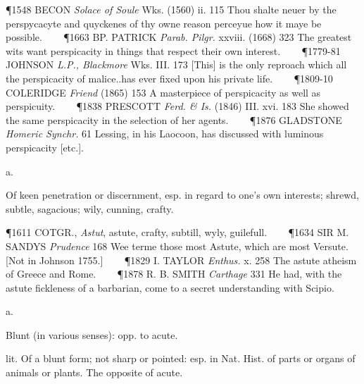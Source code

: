 \begin{description}[wide, labelwidth=!, labelindent=0pt]
\begin{myenumerate}
\P 1548 BECON  \textit{Solace of Soule} Wks. (1560) ii. 115 Thou shalte neuer by the perspycacyte and quyckenes of thy owne reason perceyue how it maye be possible.    
\P 1663 BP. PATRICK  \textit{Parab. Pilgr.} xxviii. (1668) 323 The greatest wits want perspicacity in things that respect their own interest.    
\P 1779-81 JOHNSON  \textit{L.P., Blackmore} Wks. III. 173 [This] is the only reproach which all the perspicacity of malice..has ever fixed upon his private life.    
\P 1809-10 COLERIDGE  \textit{Friend} (1865) 153 A masterpiece of perspicacity as well as perspicuity.    
\P 1838 PRESCOTT  \textit{Ferd. \& Is.} (1846) III. xvi. 183 She showed the same perspicacity in the selection of her agents.    
\P 1876 GLADSTONE  \textit{Homeric Synchr.} 61 Lessing, in his Laocoon, has discussed with luminous perspicacity [etc.].
\end{myenumerate}

 a.

\noindent {}

\vspace{-0.3cm}

Of keen penetration or discernment, esp. in regard to one's own interests; shrewd, subtle, sagacious; wily, cunning, crafty.

\P 1611 COTGR.,  \textit{Astut}, astute, crafty, subtill, wyly, guilefull.    
\P 1634 SIR M. SANDYS  \textit{Prudence} 168 Wee terme those most Astute, which are most Versute. [Not in Johnson 1755.]    
\P 1829 I. TAYLOR  \textit{Enthus.} x. 258 The astute atheism of Greece and Rome.    
\P 1878 R. B. SMITH  \textit{Carthage} 331 He had, with the astute fickleness of a barbarian, come to a secret understanding with Scipio.



 a.

\noindent {}


\vspace{0.1cm}
\noindent Blunt (in various senses): opp. to acute.

\vspace{-0.4cm}
\begin{myenumerate}
 lit. Of a blunt form; not sharp or pointed: esp. in Nat. Hist. of parts or organs of animals or plants. The opposite of acute.


\end{myenumerate}
\end{description}
